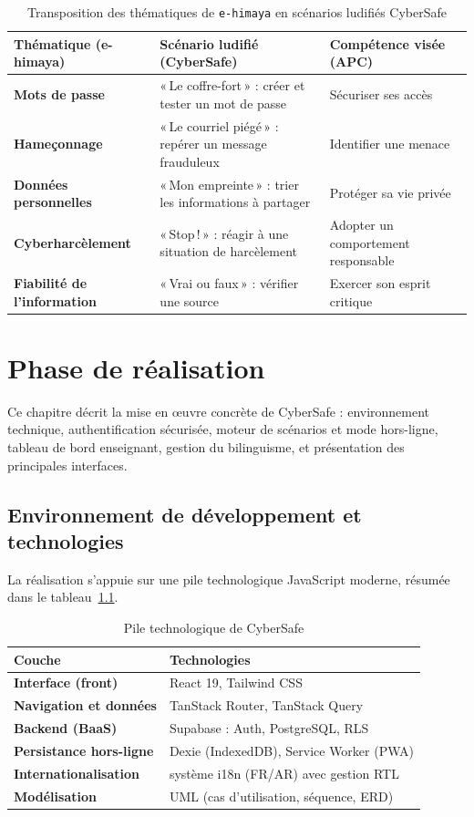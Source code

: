 \documentclass[12pt, a4paper, oneside]{report}
\begin{document}
\begin{table}[H]
\centering
\caption{Transposition des thématiques de \texttt{e-himaya} en scénarios ludifiés CyberSafe}
\label{tab:mapping}
\begin{tabularx}{\textwidth}{@{}>{\bfseries}l X X@{}}
\toprule
Thématique (e-himaya) & Scénario ludifié (CyberSafe) & Compétence visée (APC) \\
\midrule
Mots de passe & «\,Le coffre-fort\,» : créer et tester un mot de passe & Sécuriser ses accès \\
Hameçonnage & «\,Le courriel piégé\,» : repérer un message frauduleux & Identifier une menace \\
Données personnelles & «\,Mon empreinte\,» : trier les informations à partager & Protéger sa vie privée \\
Cyberharcèlement & «\,Stop\,!\,» : réagir à une situation de harcèlement & Adopter un comportement responsable \\
Fiabilité de l'information & «\,Vrai ou faux\,» : vérifier une source & Exercer son esprit critique \\
\bottomrule
\end{tabularx}
\end{table}

\chapter{Phase de réalisation}

Ce chapitre décrit la mise en œuvre concrète de CyberSafe : environnement technique, authentification sécurisée, moteur de scénarios et mode hors-ligne, tableau de bord enseignant, gestion du bilinguisme, et présentation des principales interfaces.

\section{Environnement de développement et technologies}
La réalisation s'appuie sur une pile technologique JavaScript moderne, résumée dans le tableau~\ref{tab:techno}.

\begin{table}[H]
\centering
\caption{Pile technologique de CyberSafe}
\label{tab:techno}
\begin{tabularx}{\textwidth}{@{}>{\bfseries}l X@{}}
\toprule
Couche & Technologies \\
\midrule
Interface (front) & React 19, Tailwind CSS \\
Navigation et données & TanStack Router, TanStack Query \\
Backend (BaaS) & Supabase : Auth, PostgreSQL, RLS \\
Persistance hors-ligne & Dexie (IndexedDB), Service Worker (PWA) \\
Internationalisation & système i18n (FR/AR) avec gestion RTL \\
Modélisation & UML (cas d'utilisation, séquence, ERD) \\
\bottomrule
\end{tabularx}
\end{table}
\end{document}
